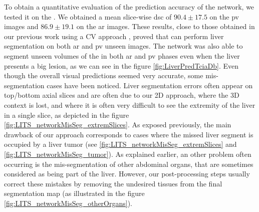 To obtain a quantitative evaluation of the prediction accuracy of the
 network, we tested it on the \textbf{}. We
obtained a mean slice-wise \ac{dsc} of $ 90.4 \pm 17.5 $ on the \ac{pv} images and
$ 86.9 \pm 19.1 $ on the \ac{ar} images. These results, close to those obtained
in our previous work using a CV approach \cite{Ouhmich2019}, proved that  can perform liver segmentation on both \ac{ar} and \ac{pv} unseen images.
The  network was also able to segment unseen volumes of the
\textbf{} in both \ac{ar} and \ac{pv} phases even when the liver presents a big lesion, as we can see in the figure \ref{fig:LiverPredTciaDb}.
Even though the overall visual predictions seemed very accurate, some mis-segmentation cases have been noticed. Liver segmentation errors often appear on top/bottom axial slices and are often due to our 2D approach, where the 3D context is lost, and where it is often very difficult to see the extremity of the liver in a single slice, as depicted in the figure \ref{fig:LITS_networkMisSeg_extremSlices}. As exposed previously, the main drawback of our approach corresponds to cases where the missed liver segment is occupied by a liver tumor (see \ref{fig:LITS_networkMisSeg_extremSlices} and \ref{fig:LITS_networkMisSeg_tumor}).
As explained earlier, an other problem often occurring is the mis-segmentation of other abdominal organs, that are sometimes considered as being part of the liver. However, our post-processing steps usually correct these mistakes by removing the undesired tissues from the final segmentation map (as illustrated in the figure \ref{fig:LITS_networkMisSeg_otherOrgans}).


